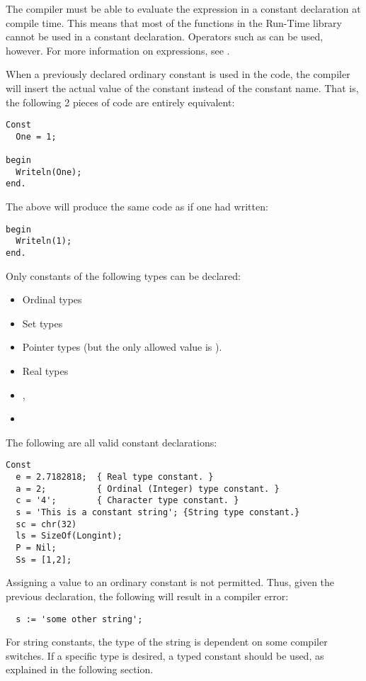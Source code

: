 

The compiler must be able to evaluate the expression in a constant
declaration at compile time.  This means that most of the functions
in the Run-Time library cannot be used in a constant
declaration.
Operators such as  can be used, however. 
For more information on expressions, see .

When a previously declared ordinary constant is used in the code, the compiler will insert
the actual value of the constant instead of the constant name. That is, the
following 2 pieces of code are entirely equivalent:

\begin{verbatim}
Const
  One = 1;

begin
  Writeln(One);
end.
\end{verbatim}
The above will produce the same code as if one had written:
\begin{verbatim}
begin
  Writeln(1);
end.
\end{verbatim}

Only constants of the following types can be declared:

\begin{itemize}
\item Ordinal types
\item Set types
\item Pointer types (but the only allowed value is ).
\item Real types
\item {},
\item {}
\end{itemize}

The following are all valid constant declarations:
\begin{verbatim}
Const
  e = 2.7182818;  { Real type constant. }
  a = 2;          { Ordinal (Integer) type constant. }
  c = '4';        { Character type constant. }
  s = 'This is a constant string'; {String type constant.}
  sc = chr(32)
  ls = SizeOf(Longint);
  P = Nil;
  Ss = [1,2];
\end{verbatim}
Assigning a value to an ordinary constant is not permitted.
Thus, given the previous declaration, the following will result
in a compiler error:
\begin{verbatim}
  s := 'some other string';
\end{verbatim}
For string constants, the type of the string is dependent on some compiler
switches. If a specific type is desired, a typed constant should be used, 
as explained in the following section.

